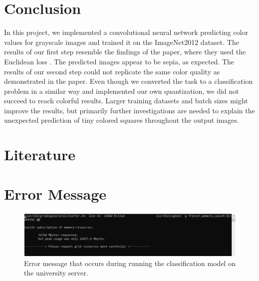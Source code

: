 \documentclass[12pt,letterpaper]{article}
\begin{document}
\section{Conclusion}
In this project, we implemented a convolutional neural network predicting color values for grayscale images \citep{Zhang.2016} and trained it on the ImageNet2012 dataset. The results of our first step resemble the findings of the paper, where they used the Euclidean loss \citep{Zhang.2016}. The predicted images appear to be sepia, as expected. The results of our second step could not replicate the same color quality as demonstrated in the paper. Even though we converted the task to a classification problem in a similar way and implemented our own quantization, we did not succeed to reach colorful results. Larger training datasets and batch sizes might improve the results, but primarily further investigations are needed to explain the unexpected prediction of tiny colored squares throughout the output images.
\newpage
\thispagestyle{empty}
\section{Literature}
\label{Lit}

\renewcommand{\bibsection}{}



\newpage
\thispagestyle{empty}
\appendix
{}
\section{Error Message}
\begin{figure}[ht]
	\centering
	\includegraphics[width=1.0\textwidth]{error.png}
	\caption{Error message that occurs during running the classification model on the university server.}
	\label{error}
\end{figure}
\newpage
{}
\end{document}
